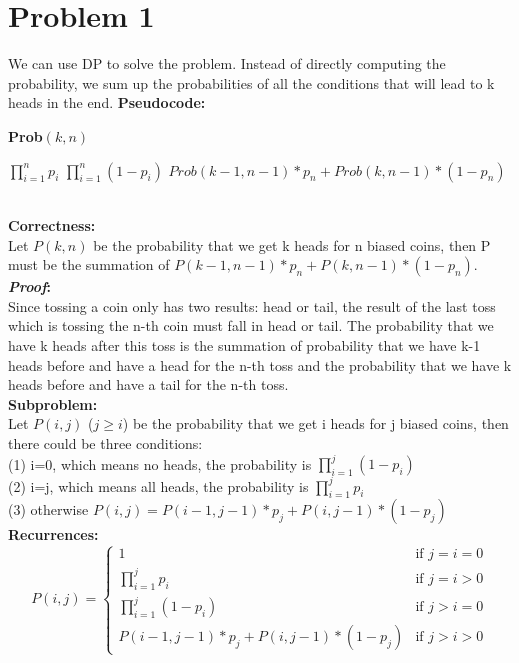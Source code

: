 \documentclass[twoside]{homework}
\begin{document}
\maketitle

\section*{Problem 1}
We can use DP to solve the problem. Instead of directly computing the probability, we sum up the probabilities of all the conditions that  will lead to k heads in the end.
\textbf{Pseudocode:} \quad
\begin{algorithm}
	\caption*{\textbf{Prob$(k,n)$}}
	\begin{algorithmic}
		\RETURN $\prod_{i=1}^{n}p_i$
		\RETURN $\prod_{i=1}^{n}(1-p_i)$
		\ELSE
		\RETURN $Prob(k-1,n-1)*p_n+Prob(k,n-1)*(1-p_n)$
		\ENDIF
	\end{algorithmic}		
\end{algorithm}
\\\textbf{Correctness:} 
\\Let $P(k,n)$ be the probability that we get k heads for n biased coins, then P must be the summation of $P(k-1,n-1)*p_n+P(k,n-1)*(1-p_n)$.
\\\textbf{\emph{Proof}:}
\\Since tossing a coin only has two results: head or tail, the result of the last toss which is tossing the n-th coin must fall in head or tail. The probability that we have k heads after this toss is the summation of probability that we have k-1 heads before and have a head for the n-th toss and the probability that we have k heads before and have a tail for the n-th toss. 
\\\textbf{Subproblem:} 
\\Let $P(i,j)$ ($j\ge i$) be the probability that we get i heads for j biased coins, then there could be three conditions:
\\(1) i=0, which means no heads, the probability is $\prod_{i=1}^{j}(1-p_i)$
\\(2) i=j, which means all heads, the probability is $\prod_{i=1}^{j}p_i$
\\(3) otherwise $P(i,j)=P(i-1,j-1)*p_j+P(i,j-1)*(1-p_j)$
\\\textbf{Recurrences:} 
$$P(i,j)=\begin{cases}
1 & \text{if $j=i=0$}\\
\prod_{i=1}^{j}p_i & \text{if $j=i>0$}\\
\prod_{i=1}^{j}(1-p_i) & \text{if $j>i=0$}\\
P(i-1,j-1)*p_j+P(i,j-1)*(1-p_j) & \text{if $j>i>0$}
\end{cases}$$
\end{document}

